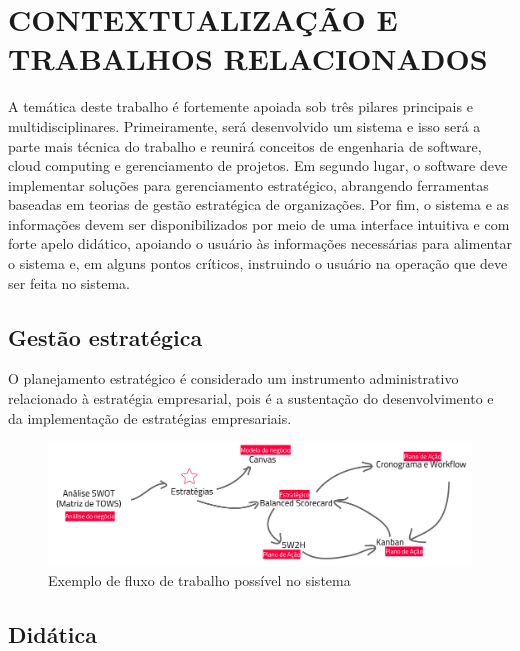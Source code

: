 \documentclass{abnt}
\begin{document}
\chapter{CONTEXTUALIZAÇÃO E TRABALHOS RELACIONADOS}

A temática deste trabalho é fortemente apoiada sob três pilares principais e
multidisciplinares. Primeiramente, será desenvolvido um sistema e isso será a
parte mais técnica do trabalho e reunirá conceitos de engenharia de software,
cloud computing e gerenciamento de projetos. Em segundo lugar, o software deve
implementar soluções para gerenciamento estratégico, abrangendo ferramentas
baseadas em teorias de gestão estratégica de organizações. Por fim, o sistema e
as informações devem ser disponibilizados por meio de uma interface intuitiva e
com forte apelo didático, apoiando o usuário às informações necessárias para
alimentar o sistema e, em alguns pontos críticos, instruindo o usuário na
operação que deve ser feita no sistema.

\section{Gestão estratégica}


O planejamento estratégico é considerado um instrumento administrativo
relacionado à estratégia empresarial, pois é a sustentação do desenvolvimento e
da implementação de estratégias empresariais\cite{OLIVEIRA1991}.


\begin{figure}[!htb]
	\centering
	\includegraphics[width=\textwidth]{fluxograma_exemplo.pdf}
	\caption{Exemplo de fluxo de trabalho possível no sistema}
	\label{Rotulo}
\end{figure}

\section{Didática}
\end{document}
